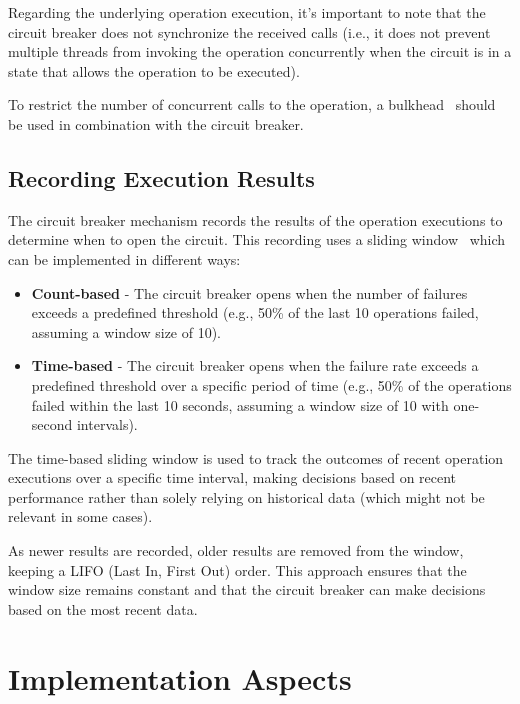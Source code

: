 Regarding the underlying operation execution,
it's important to note that the circuit breaker does not synchronize the received calls (i.e., it does not prevent multiple threads from invoking the operation concurrently when the circuit is in a state that allows the operation to be executed).

To restrict the number of concurrent calls to the operation, a bulkhead~\cite{microsoft-bulkhead-pattern} should be used in combination with the circuit breaker.

\subsection{Recording Execution Results}\label{subsec:cbreaker-recording-execution-results}

The circuit breaker mechanism records the results of the operation executions to determine when to open the circuit.
This recording uses a sliding window~\cite{sliding-window} which can be implemented in different ways:

\begin{itemize}
    \item \textbf{Count-based} -
    The circuit breaker opens when the number of failures exceeds a predefined threshold
    (e.g., 50\% of the last 10 operations failed, assuming a window size of 10).
    \item \textbf{Time-based} -
    The circuit breaker opens when the failure rate exceeds a predefined threshold over a specific period of time
    (e.g., 50\% of the operations failed within the last 10 seconds,
    assuming a window size of 10 with one-second intervals).
\end{itemize}

The time-based sliding window is used
to track the outcomes of recent operation executions over a specific time interval,
making decisions based on recent performance rather than solely relying on historical data
(which might not be relevant in some cases).

As newer results are recorded, older results are removed from the window, keeping a
LIFO (Last In, First Out) order.
This approach ensures that the window size remains constant and that the circuit breaker can make decisions based on the most recent data.


\section{Implementation Aspects}\label{sec:cbreaker-implementation-aspects}

